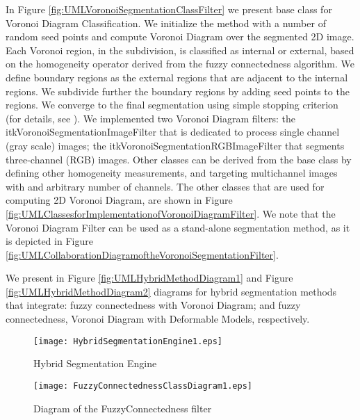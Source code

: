 In Figure \ref{fig:UMLVoronoiSegmentationClassFilter} we present base class for
Voronoi Diagram Classification. We initialize the method with a number of random
seed points and compute Voronoi Diagram over the segmented 2D image. Each
Voronoi region, in the subdivision, is classified as internal or external,
based on the homogeneity operator derived from the fuzzy connectedness
algorithm.  We define boundary regions as the external regions that are
adjacent to the internal regions.  We subdivide further the boundary regions
by adding seed points to the regions. We converge to the final segmentation
using simple stopping criterion (for details, see \cite{Imielinska2001}). We
implemented two Voronoi Diagram filters: the
itkVoronoiSegmentationImageFilter that is dedicated to process single channel
(gray scale) images; the itkVoronoiSegmentationRGBImageFilter that segments
three-channel (RGB) images. Other classes can be derived from the base class
by defining other homogeneity measurements, and targeting multichannel images
with and arbitrary number of channels.  The other classes that are used for
computing 2D Voronoi Diagram, are shown in Figure
\ref{fig:UMLClassesforImplementationofVoronoiDiagramFilter}. We note that the
Voronoi Diagram Filter can be used as a stand-alone segmentation method, as
it is depicted in Figure
\ref{fig:UMLCollaborationDiagramoftheVoronoiSegmentationFilter}.

 We present in Figure \ref{fig:UMLHybridMethodDiagram1} and Figure
 \ref{fig:UMLHybridMethodDiagram2} diagrams for hybrid segmentation methods
 that integrate: fuzzy connectedness with Voronoi Diagram; and fuzzy
 connectedness, Voronoi Diagram with Deformable Models, respectively.


%
%
%

\begin{figure}
\center
\texttt{[image: HybridSegmentationEngine1.eps]}
\caption{Hybrid Segmentation Engine}
\label{fig:ComponentsofaHybridSegmentationApproach}
\end{figure}


\begin{figure}
\center
\texttt{[image: FuzzyConnectednessClassDiagram1.eps]}
\caption{Diagram of the FuzzyConnectedness filter}
\label{fig:UMLClassDiagramoftherFuzzyConnectednessFilter}
\end{figure}


